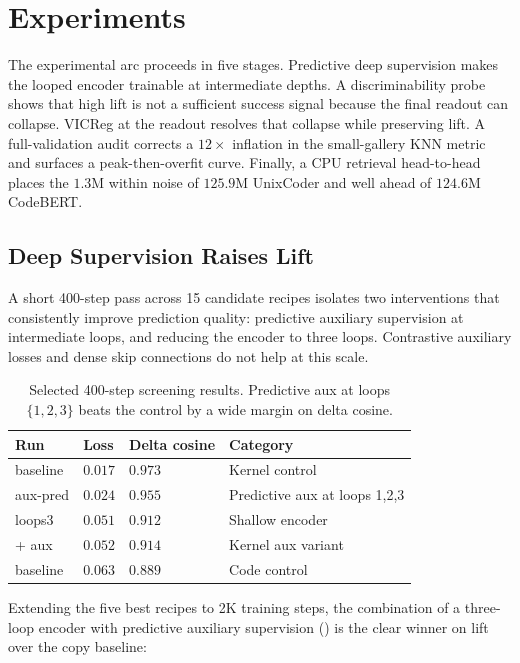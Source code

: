 \section{Experiments}
\label{sec:experiments}

The experimental arc proceeds in five stages.  Predictive deep
supervision makes the looped encoder trainable at intermediate depths.
A discriminability probe shows that high lift is not a sufficient
success signal because the final readout can collapse.  VICReg at the
readout resolves that collapse while preserving lift.  A
full-validation audit corrects a $12\times$ inflation in the
small-gallery KNN metric and surfaces a peak-then-overfit curve.
Finally, a CPU retrieval head-to-head places the $1.3$M \CodeWM{}
within noise of $125.9$M UnixCoder and well ahead of $124.6$M
CodeBERT.

\subsection{Deep Supervision Raises Lift}
\label{subsec:deepsup}

A short 400-step pass across 15 candidate recipes isolates two
interventions that consistently improve prediction quality: predictive
auxiliary supervision at intermediate loops, and reducing the encoder
to three loops.  Contrastive auxiliary losses and dense skip connections
do not help at this scale.

\begin{table}[t]
\centering
\caption{Selected 400-step screening results.  Predictive aux at loops
$\{1,2,3\}$ beats the \CodeWM{} control by a wide margin on delta
cosine.}
\label{tab:wave1}
\smallskip
\begin{tabular}{llll}
\toprule
Run & Loss & Delta cosine & Category \\
\midrule
\KernelWM{} baseline & $0.017$ & $0.973$ & Kernel control \\
aux-pred & $0.024$ & $0.955$ & Predictive aux at loops 1,2,3 \\
loops3 & $0.051$ & $0.912$ & Shallow encoder \\
\KernelWM{} + aux & $0.052$ & $0.914$ & Kernel aux variant \\
\CodeWM{} baseline & $0.063$ & $0.889$ & Code control \\
\bottomrule
\end{tabular}
\end{table}

Extending the five best recipes to 2K training steps, the combination
of a three-loop encoder with predictive auxiliary supervision
() is the clear winner on lift over the copy
baseline:

